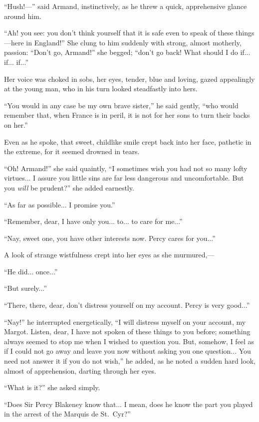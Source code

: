 \documentclass[paper=5.5in:8.5in,BCOR=7mm,twoside,DIV=calc,12pt,usegeometry,chapterprefix,endperiod,headings=big]{scrbook}
\begin{document}
\enquote{Hush!---} said Armand, instinctively, as he threw a quick, apprehensive glance around him.

\enquote{Ah! you see: you don't think yourself that it is safe even to speak of these things---here in England!} She clung to him suddenly with strong, almost motherly, passion: \enquote{Don't go, Armand!} she begged; \enquote{don't go back! What should I do if... if... if...}

Her voice was choked in sobs, her eyes, tender, blue and loving, gazed appealingly at the young man, who in his turn looked steadfastly into hers.

\enquote{You would in any case be my own brave sister,} he said gently, \enquote{who would remember that, when France is in peril, it is not for her sons to turn their backs on her.}

Even as he spoke, that sweet, childlike smile crept back into her face, pathetic in the extreme, for it seemed drowned in tears.

\enquote{Oh! Armand!} she said quaintly, \enquote{I sometimes wish you had not so many lofty virtues... I assure you little sins are far less dangerous and uncomfortable. But you \textit{will} be prudent?} she added earnestly.

\enquote{As far as possible... I promise you.}

\enquote{Remember, dear, I have only you... to... to care for me...}

\enquote{Nay, sweet one, you have other interests now. Percy cares for you...}

A look of strange wistfulness crept into her eyes as she murmured,---

\enquote{He did... once...}

\enquote{But surely...}

\enquote{There, there, dear, don't distress yourself on my account. Percy is very good...}

\enquote{Nay!} he interrupted energetically, \enquote{I will distress myself on your account, my Margot. Listen, dear, I have not spoken of these things to you before; something always seemed to stop me when I wished to question you. But, somehow, I feel as if I could not go away and leave you now without asking you one question... You need not answer it if you do not wish,} he added, as he noted a sudden hard look, almost of apprehension, darting through her eyes.

\enquote{What is it?} she asked simply.

\enquote{Does Sir Percy Blakeney know that... I mean, does he know the part you played in the arrest of the Marquis de St.~Cyr?}
\end{document}
